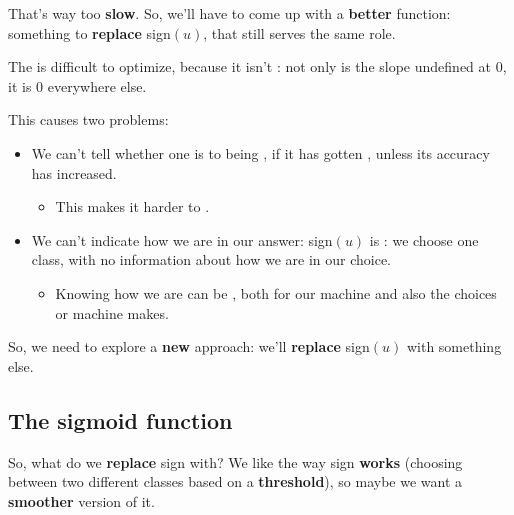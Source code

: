         That's way too \textbf{slow}. So, we'll have to come up with a \textbf{better} function: something to \textbf{replace} sign$(u)$, that still serves the same role.\\
        
        \begin{concept}
            The  is difficult to optimize, because it isn't : not only is the slope undefined at 0, it is 0 everywhere else.
            
            This causes two problems:
            
            \begin{itemize}
                \item We can't tell whether one  is  to being , if it has gotten , unless its accuracy has increased. 
                    \begin{itemize}
                        \item This makes it harder to .
                    \end{itemize}
                
                \item We can't indicate how  we are in our answer: sign$(u)$ is : we choose one class, with no information about how  we are in our choice.
                    \begin{itemize}
                        \item Knowing how  we are can be , both for  our machine and also  the choices or machine makes.
                    \end{itemize}
            \end{itemize}
        \end{concept}
        
        So, we need to explore a \textbf{new} approach: we'll \textbf{replace} sign$(u)$ with something else.
    
    \subsection{The sigmoid function}
    
        So, what do we \textbf{replace} sign with? We like the way sign \textbf{works} (choosing between two different classes based on a \textbf{threshold}), so maybe we want a \textbf{smoother} version of it.
        
